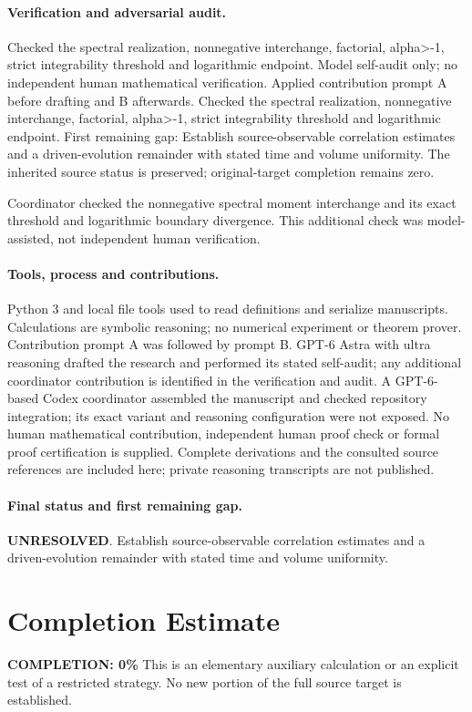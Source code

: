 \documentclass[11pt]{article}
\begin{document}
\paragraph{Verification and adversarial audit.}
Checked the spectral realization, nonnegative interchange, factorial, alpha>-1, strict integrability threshold and logarithmic endpoint. Model self-audit only; no independent human mathematical verification. Applied contribution prompt A before drafting and B afterwards. Checked the spectral realization, nonnegative interchange, factorial, alpha>-1, strict integrability threshold and logarithmic endpoint. First remaining gap: Establish source-observable correlation estimates and a driven-evolution remainder with stated time and volume uniformity. The inherited source status is preserved; original-target completion remains zero.

Coordinator checked the nonnegative spectral moment interchange and its exact threshold and logarithmic boundary divergence. This additional check was model-assisted, not independent human verification.

\paragraph{Tools, process and contributions.}
Python 3 and local file tools used to read definitions and serialize manuscripts. Calculations are symbolic reasoning; no numerical experiment or theorem prover. Contribution prompt A was followed by prompt B. GPT-6 Astra with ultra reasoning drafted the research and performed its stated self-audit; any additional coordinator contribution is identified in the verification and audit. A GPT-6-based Codex coordinator assembled the manuscript and checked repository integration; its exact variant and reasoning configuration were not exposed. No human mathematical contribution, independent human proof check or formal proof certification is supplied. Complete derivations and the consulted source references are included here; private reasoning transcripts are not published.

\paragraph{Final status and first remaining gap.}
\textbf{UNRESOLVED}. Establish source-observable correlation estimates and a driven-evolution remainder with stated time and volume uniformity.

\section{Completion Estimate}
\noindent\textbf{COMPLETION: 0\%}
This is an elementary auxiliary calculation or an explicit test of a restricted strategy. No new portion of the full source target is established.
\end{document}
